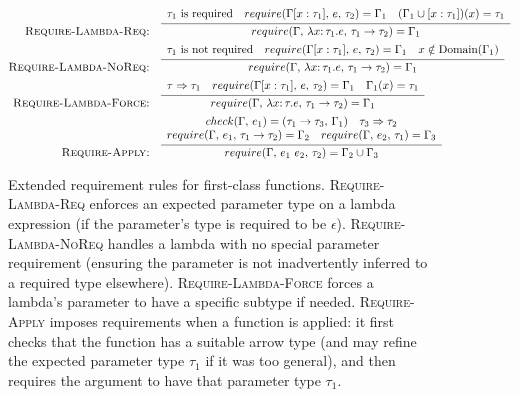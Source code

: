 \documentclass[peerreview, 10pt]{IEEEtran}
\newcommand{\funct}[3]{\ensuremath{\lambda #1\mathsf{:}\,#2.#3}}
\newcommand{\apply}[2]{\ensuremath{#1\ #2}}
\newcommand{\arrowt}[2]{\ensuremath{{#1}\rightarrow{#2}}}
\newcommand{\checktype}[4]{\ensuremath{{check}(#1,\,#2)=(#3,\,#4)}}
\newcommand{\requiretype}[4]{\ensuremath{{require}(#1,\,#2,\,#3)=#4}}
\newcommand{\required}[1]{\ensuremath{#1\text{ is required}}}
\newcommand{\nrequired}[1]{\ensuremath{#1\text{ is not required}}}
\newcommand{\forcerequire}[2]{\ensuremath{#1\Rightarrow#2}}
\begin{document}
\begin{figure*}[ht]
\centering
\begin{framed}
\begin{align*}
\text{\textsc{Require-Lambda-Req:}} &\quad \infer{\requiretype{\Gamma}{\funct{x}{\tau_1}{e}}{\arrowt{\tau_1}{\tau_2}}{\Gamma_1}}{
\begin{array}{c}
\required{\tau_1} \quad \requiretype{\Gamma[x:\tau_1]}{e}{\tau_2}{\Gamma_1}\quad
(\Gamma_1\cup[x:\tau_1])(x)=\tau_1
\end{array}} \\
\text{\textsc{Require-Lambda-NoReq:}} &\quad \infer{\requiretype{\Gamma}{\funct{x}{\tau_1}{e}}{\arrowt{\tau_1}{\tau_2}}{\Gamma_1}}{
\begin{array}{c}
\nrequired{\tau_1} \quad
\requiretype{\Gamma[x:\tau_1]}{e}{\tau_2}{\Gamma_1} \quad x \notin \text{Domain}(\Gamma_1)
\end{array}
} \\
\text{\textsc{Require-Lambda-Force:}} &\quad \infer{\requiretype{\Gamma}{\funct{x}{\tau}{e}}{\arrowt{\tau_1}{\tau_2}}{\Gamma_1}}{
\begin{array}{c}
\forcerequire{\tau}{\tau_1} \quad \requiretype{\Gamma[x:\tau_1]}{e}{\tau_2}{\Gamma_1} \quad \Gamma_1(x) = \tau_1
\end{array}
} \\
\text{\textsc{Require-Apply:}} &\quad \infer{\requiretype{\Gamma}{\apply{e_1}{e_2}}{\tau_2}{\Gamma_2 \cup \Gamma_3}}{
\begin{array}{c}
\checktype{\Gamma}{e_1}{\arrowt{\tau_1}{\tau_3}}{\Gamma_1} \quad \forcerequire{\tau_3}{\tau_2}\\
\requiretype{\Gamma}{e_1}{\arrowt{\tau_1}{\tau_2}}{\Gamma_2} \quad \requiretype{\Gamma}{e_2}{\tau_1}{\Gamma_3}
\end{array}
}
\end{align*}
\end{framed}
\caption{Extended requirement rules for first-class functions. \textsc{Require-Lambda-Req} enforces an expected parameter type on a lambda expression (if the parameter's type is required to be $\epsilon$). \textsc{Require-Lambda-NoReq} handles a lambda with no special parameter requirement (ensuring the parameter is not inadvertently inferred to a required type elsewhere). \textsc{Require-Lambda-Force} forces a lambda's parameter to have a specific subtype if needed. \textsc{Require-Apply} imposes requirements when a function is applied: it first checks that the function has a suitable arrow type (and may refine the expected parameter type $\tau_1$ if it was too general), and then requires the argument to have that parameter type $\tau_1$.}
\label{fig:function-require-rules}
\end{figure*}
\end{document}

